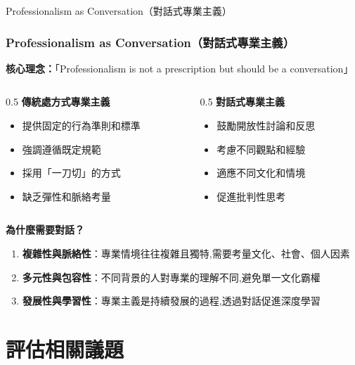 \documentclass[aspectratio=169]{beamer}
\begin{document}
\begin{frame}{Professionalism as Conversation（對話式專業主義）}
\frametitle{Professionalism as Conversation（對話式專業主義）}

\textbf{核心理念：}「Professionalism is not a prescription but should be a conversation」

\vspace{0.5cm}

\begin{columns}
\begin{column}{0.5\textwidth}
\textbf{傳統處方式專業主義}
\begin{itemize}
    \item 提供固定的行為準則和標準
    \item 強調遵循既定規範
    \item 採用「一刀切」的方式
    \item 缺乏彈性和脈絡考量
\end{itemize}
\end{column}

\begin{column}{0.5\textwidth}
\textbf{對話式專業主義}
\begin{itemize}
    \item 鼓勵開放性討論和反思
    \item 考慮不同觀點和經驗
    \item 適應不同文化和情境
    \item 促進批判性思考
\end{itemize}
\end{column}
\end{columns}

\vspace{0.5cm}

\textbf{為什麼需要對話？}
\begin{enumerate}
    \item \textbf{複雜性與脈絡性}：專業情境往往複雜且獨特,需要考量文化、社會、個人因素
    \item \textbf{多元性與包容性}：不同背景的人對專業的理解不同,避免單一文化霸權
    \item \textbf{發展性與學習性}：專業主義是持續發展的過程,透過對話促進深度學習
\end{enumerate}
\end{frame}

\section{評估相關議題}
\end{document}
